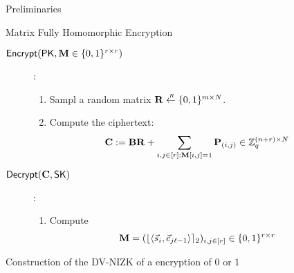 \begin{section}{Preliminaries}
\begin{subsection}{Matrix Fully Homomorphic Encryption~\cite{DBLP:conf/pkc/HiromasaAO15}}
\begin{description}
    \item[${\mathsf{Encrypt}}(\mathsf{PK}, \mathbf{M} \in \{0,1\}^{r \times r})$] :
      \begin{enumerate}
      \item Sampl a random matrix $\mathbf{R} \stackrel{{\scriptscriptstyle \mkern4mu R}}{\gets} \{0,1\}^{m \times N}$.
      \item Compute the ciphertext:
        \begin{align*}
          \mathbf{C} &:= \mathbf{B} \mathbf{R} + \sum_{i,j \in [r] : \mathbf{M}[i,j] = 1} \mathbf{P}_{(i,j)} \in \mathbb{Z}_q^{(n+r) \times N}
        \end{align*}
      \end{enumerate}

    \item[${\mathsf{Decrypt}}(\mathbf{C}, \mathsf{SK})$]:
      \begin{enumerate}
      \item Compute
        \begin{align*}
          \mathbf{M} &=(\lfloor\langle \vec{s}_i, \vec{c}_{j\ell-1} \rangle\rceil_2)_{i,j \in [r]} \in \{0,1\}^{r \times r}
        \end{align*}
      \end{enumerate}
    \end{description}
  \end{subsection}
  
  
  \begin{subsection}{Construction of the DV-NIZK of a encryption of $0$ or $1$}
    

\end{subsection}
\end{section}
